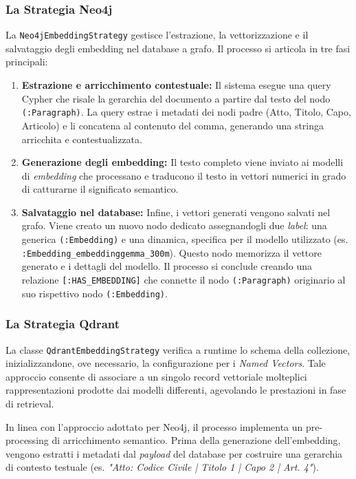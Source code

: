 \subsubsection{La Strategia Neo4j}
La \texttt{Neo4jEmbeddingStrategy} gestisce l'estrazione, la vettorizzazione e il salvataggio degli embedding nel database a grafo. Il processo si articola in tre fasi principali:

\begin{enumerate}
    \item \textbf{Estrazione e arricchimento contestuale:} Il sistema esegue una query Cypher che risale la gerarchia del documento a partire dal testo del nodo \texttt{(:Paragraph)}. La query estrae i metadati dei nodi padre (Atto, Titolo, Capo, Articolo) e li concatena al contenuto del comma, generando una stringa arricchita e contestualizzata.
    \item \textbf{Generazione degli embedding:} Il testo completo viene inviato ai modelli di \textit{embedding} che processano e traducono il testo in vettori numerici in grado di catturarne il significato semantico.
    \item \textbf{Salvataggio nel database:} Infine, i vettori generati vengono salvati nel grafo. Viene creato un nuovo nodo dedicato assegnandogli due \textit{label}: una generica \texttt{(:Embedding)} e una dinamica, specifica per il modello utilizzato (es. \texttt{:Embedding\_embeddinggemma\_300m}). Questo nodo memorizza il vettore generato e i dettagli del modello. Il processo si conclude creando una relazione \texttt{[:HAS\_EMBEDDING]} che connette il nodo \texttt{(:Paragraph)} originario al suo rispettivo nodo \texttt{(:Embedding)}.
\end{enumerate}

\subsubsection{La Strategia Qdrant}
La classe \texttt{QdrantEmbeddingStrategy} verifica a runtime lo schema della collezione, inizializzandone, ove necessario, la configurazione per i \textit{Named Vectors}. Tale approccio consente di associare a un singolo record vettoriale molteplici rappresentazioni prodotte dai modelli differenti, agevolando le prestazioni in fase di retrieval.

In linea con l'approccio adottato per Neo4j, il processo implementa un pre-processing di arricchimento semantico. Prima della generazione dell'embedding, vengono estratti i metadati dal \textit{payload} del database per costruire una gerarchia di contesto testuale (es. \textit{"Atto: Codice Civile | Titolo 1 | Capo 2 | Art. 4"}).
